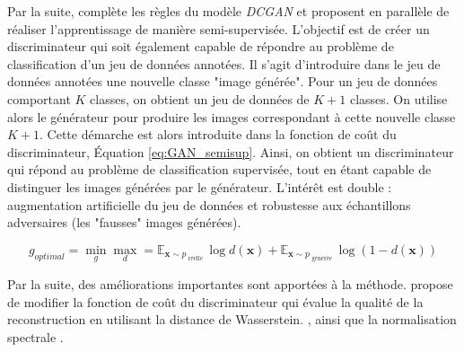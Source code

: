 Par la suite, \cite{salimans_improved_2016} complète les règles du modèle \textit{DCGAN} et \cite{odena_semisupervised_2016, salimans_improved_2016} proposent en parallèle de réaliser l'apprentissage de manière semi-supervisée.
L'objectif est de créer un discriminateur qui soit également capable de répondre au problème de classification d'un jeu de données annotées.
Il s'agit d'introduire dans le jeu de données annotées une nouvelle classe "image générée".
Pour un jeu de données comportant $K$ classes, on obtient un jeu de données de $K+1$ classes.
On utilise alors le générateur pour produire les images correspondant à cette nouvelle classe $K+1$.
Cette démarche est alors introduite dans la fonction de coût du discriminateur, Équation \ref{eq:GAN_semisup}.
Ainsi, on obtient un discriminateur qui répond au problème de classification supervisée, tout en étant capable de distinguer les images générées par le générateur.
L'intérêt est double : augmentation artificielle du jeu de données et robustesse aux échantillons adversaires (les "fausses" images générées).

\begin{equation} \label{eq:GAN_semisup}
g_{optimal}  = \min _{g} \max _{d} = \mathbb{E}_{\mathbf{x} \sim p_{\text { réelle }}} \log d(\boldsymbol{x})+\mathbb{E}_{\boldsymbol{x} \sim p_{\text { générée }}} \log (1-d(\boldsymbol{x}))
\end{equation}

Par la suite, des améliorations importantes sont apportées à la méthode. \cite{arjovsky_wasserstein_2017} propose de modifier la fonction de coût du discriminateur qui évalue la qualité de la reconstruction en utilisant la distance de Wasserstein.
\cite{gulrajani_improved_2017}, ainsi que la normalisation spectrale \cite{miyato_spectral_2018}.

